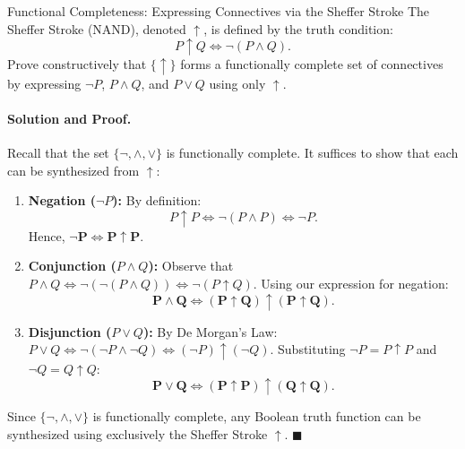 \begin{workedexample}{Functional Completeness: Expressing Connectives via the Sheffer Stroke}
The Sheffer Stroke (NAND), denoted $\uparrow$, is defined by the truth condition:
\[
P \uparrow Q \iff \neg(P \land Q).
\]
Prove constructively that $\{\uparrow\}$ forms a functionally complete set of connectives by expressing $\neg P$, $P \land Q$, and $P \lor Q$ using only $\uparrow$.

\paragraph{Solution and Proof.}
Recall that the set $\{\neg, \land, \lor\}$ is functionally complete. It suffices to show that each can be synthesized from $\uparrow$:
\begin{enumerate}[leftmargin=1.4em,itemsep=3pt]
  \item \textbf{Negation ($\neg P$):}
  By definition:
  \[
  P \uparrow P \iff \neg(P \land P) \iff \neg P.
  \]
  Hence, $\mathbf{\neg P \iff P \uparrow P}$.

  \item \textbf{Conjunction ($P \land Q$):}
  Observe that $P \land Q \iff \neg(\neg(P \land Q)) \iff \neg(P \uparrow Q)$.
  Using our expression for negation:
  \[
  \mathbf{P \land Q \iff (P \uparrow Q) \uparrow (P \uparrow Q)}.
  \]

  \item \textbf{Disjunction ($P \lor Q$):}
  By De Morgan's Law: $P \lor Q \iff \neg(\neg P \land \neg Q) \iff (\neg P) \uparrow (\neg Q)$.
  Substituting $\neg P = P \uparrow P$ and $\neg Q = Q \uparrow Q$:
  \[
  \mathbf{P \lor Q \iff (P \uparrow P) \uparrow (Q \uparrow Q)}.
  \]
\end{enumerate}
Since $\{\neg, \land, \lor\}$ is functionally complete, any Boolean truth function can be synthesized using exclusively the Sheffer Stroke $\uparrow$. $\blacksquare$
\end{workedexample}


